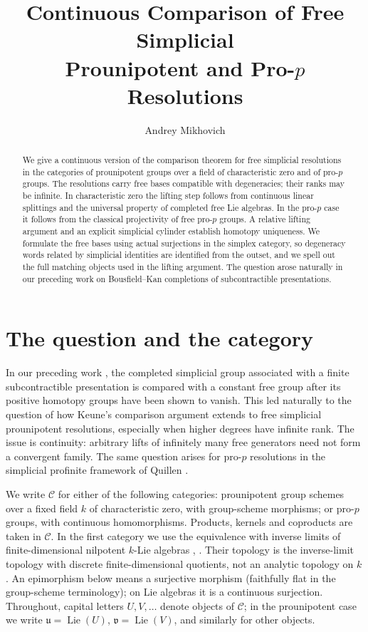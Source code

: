 \documentclass[11pt,a4paper]{article}
\title{Continuous Comparison of Free Simplicial\protect\\
Prounipotent and Pro-\(p\) Resolutions}
\author{Andrey Mikhovich}
\date{}
\theoremstyle{definition}
\newcommand{\C}{\mathcal C}
\newcommand{\Lie}{\operatorname{Lie}}
\begin{document}
\maketitle
\begin{abstract}
We give a continuous version of the comparison theorem for free simplicial
resolutions in the categories of prounipotent groups over a field of
characteristic zero and of pro-$p$ groups. The resolutions carry free bases
compatible with degeneracies; their ranks may be infinite. In characteristic
zero the lifting step follows from continuous linear splittings and the
universal property of completed free Lie algebras. In the pro-$p$ case it
follows from the classical projectivity of free pro-$p$ groups. A relative
lifting argument and an explicit simplicial cylinder establish homotopy
uniqueness. We formulate the free bases using actual surjections in the
simplex category, so degeneracy words related by simplicial identities are
identified from the outset, and we spell out the full matching objects used in
the lifting argument. The question arose naturally in our preceding work on
Bousfield--Kan completions of subcontractible presentations.
\end{abstract}

\section{The question and the category}

In our preceding work \cite{Mikhovich}, the completed simplicial group
associated with a finite subcontractible presentation is compared with a
constant free group after its positive homotopy groups have been shown to
vanish. This led naturally to the question of how Keune's comparison
argument \cite{Keune} extends to free simplicial prounipotent resolutions,
especially when higher degrees have infinite rank. The issue is continuity:
arbitrary lifts of infinitely many free generators need not form a
convergent family. The same question arises for pro-$p$ resolutions in the
simplicial profinite framework of Quillen \cite{Quillen}.

We write $\C$ for either of the following categories: prounipotent
group schemes over a fixed field $k$ of characteristic zero, with
group-scheme morphisms; or pro-$p$ groups, with continuous homomorphisms.
Products, kernels and coproducts are taken in $\C$.
In the first category we use the equivalence with inverse limits of
finite-dimensional nilpotent $k$-Lie algebras
\cite[Appendix~A]{QuillenRHT}, \cite[Section~2]{HainMatsumoto}.
Their topology is the inverse-limit topology with discrete
finite-dimensional quotients, not an analytic topology on $k$.
An epimorphism below means a surjective morphism (faithfully flat in the
group-scheme terminology); on Lie algebras it is a continuous surjection.
Throughout, capital letters $U,V,\ldots$ denote objects of $\C$; in the
prounipotent case we write $\mathfrak u=\Lie(U)$, $\mathfrak v=\Lie(V)$,
and similarly for other objects.
\end{document}
